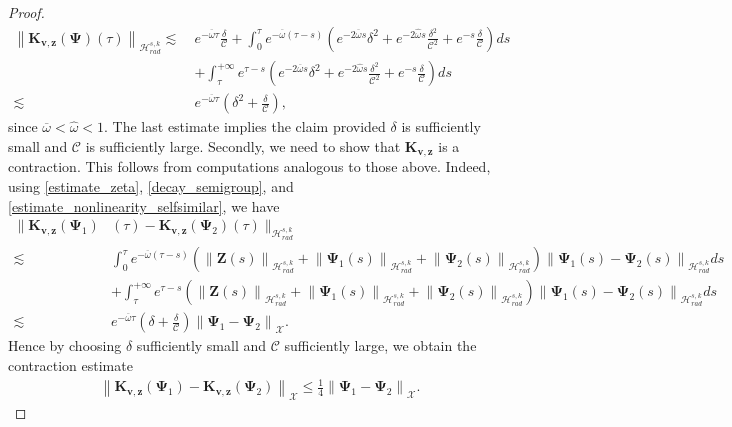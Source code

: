 \documentclass[10pt,a4paper]{amsart}
\newcommand{\HH}{\mathcal{H}}
\newcommand{\norm}[1]{\left\|#1\right\|}
\begin{document}
\begin{proof}
\begin{align*}
			\norm{\mathbf{K}_{\mathbf{v},\mathbf{z}}(\mathbf{\Psi})(\tau)}_{\HH_{rad}^{s,k}}\lesssim \ & e^{-\overline{\omega} \tau}\frac{\delta}{\mathcal{C}}+\int_0^\tau e^{-\overline{\omega}(\tau-s)} \left(e^{-2\overline{\omega} s}\delta^2+e^{-2\hat{\omega} s}\frac{\delta^2}{\mathcal{C}^2}+e^{- s}\frac{\delta}{\mathcal{C}}\right)ds\\ & +\int_{\tau}^{+\infty} e^{\tau-s}\left(e^{-2\overline{\omega} s}\delta^2+e^{-2\hat{\omega} s}\frac{\delta^2}{\mathcal{C}^2}+e^{- s}\frac{\delta}{\mathcal{C}}\right)ds\\  \lesssim \ & e^{-\overline{\omega} \tau}\left(\delta^2+\frac{\delta}{\mathcal{C}}\right),
		\end{align*}
		since $\overline{\omega}<\hat{\omega}<1$.
		The last estimate implies the claim provided $\delta$ is sufficiently small and $\mathcal{C}$ is sufficiently large. Secondly, we need to show that $\mathbf{K}_{\mathbf{v},\mathbf{z}}$ is a contraction. This follows from computations analogous to those above. Indeed, using \eqref{estimate_zeta}, \eqref{decay_semigroup}, and \eqref{estimate_nonlinearity_selfsimilar}, we have
		\begin{align*}
			\| \mathbf{K}_{\mathbf{v},\mathbf{z}}(\mathbf{\Psi}_1)&(\tau)-\mathbf{K}_{\mathbf{v},\mathbf{z}}(\mathbf{\Psi}_2)(\tau)\|_{\HH_{rad}^{s,k}}\\  \lesssim \ & \int_0^{\tau} e^{-\overline{\omega}(\tau-s)}\left(\norm{\mathbf{Z}(s)}_{\HH_{rad}^{s,k}}+\norm{\mathbf{\Psi}_1(s)}_{\HH_{rad}^{s,k}}+\norm{\mathbf{\Psi}_2(s)}_{\HH_{rad}^{s,k}}\right)\norm{\mathbf{\Psi}_1(s)-\mathbf{\Psi}_2(s)}_{\HH_{rad}^{s,k}}ds\\ & +\int_{\tau}^{+\infty} e^{\tau-s} \left(\norm{\mathbf{Z}(s)}_{\HH_{rad}^{s,k}}+\norm{\mathbf{\Psi}_1(s)}_{\HH_{rad}^{s,k}}+\norm{\mathbf{\Psi}_2(s)}_{\HH_{rad}^{s,k}}\right)\norm{\mathbf{\Psi}_1(s)-\mathbf{\Psi}_2(s)}_{\HH_{rad}^{s,k}} ds\\  \lesssim \ &e^{-\overline{\omega} \tau}(\delta+\frac{\delta}{\mathcal{C}})\norm{\mathbf{\Psi}_1-\mathbf{\Psi}_2}_{\mathcal{X}}.
		\end{align*}
		Hence by choosing $\delta$ sufficiently small and $\mathcal{C}$ sufficiently large, we obtain the contraction estimate
		\begin{align}\label{contraction_estimate}
			\norm{\mathbf{K}_{\mathbf{v},\mathbf{z}}(\mathbf{\Psi}_1)-\mathbf{K}_{\mathbf{v},\mathbf{z}}(\mathbf{\Psi}_2)}_{\mathcal{X}}\leq \frac{1}{4}   \norm{\mathbf{\Psi}_1-\mathbf{\Psi}_2}_{\mathcal{X}}.
		\end{align}

\end{proof}
\end{document}
